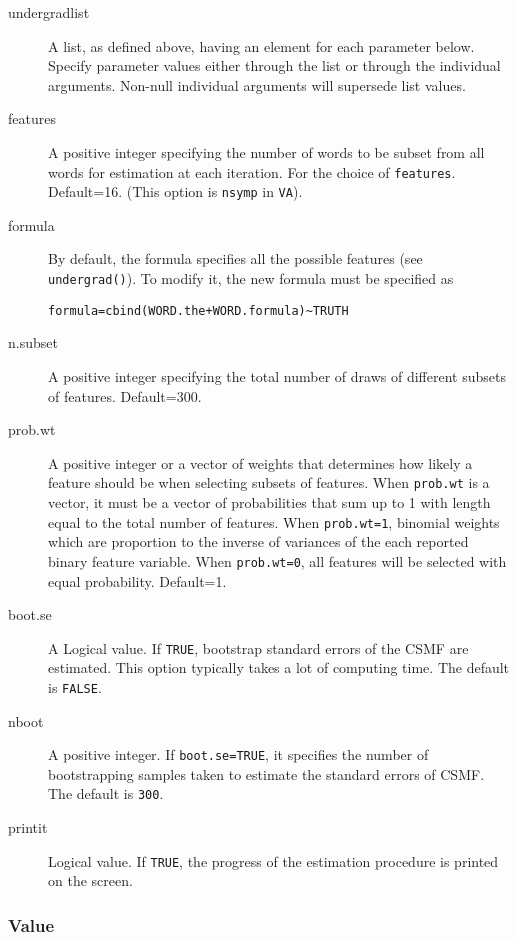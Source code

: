 \documentclass[oneside,letterpaper,titlepage]{article}
\begin{document}
\begin{description}
 
\item[undergradlist] A list, as defined above, having an element for
  each parameter below. Specify parameter values either through the
  list or through the individual arguments. Non-null individual
  arguments will supersede list values.
\item[features] A positive integer specifying the number of words to
  be subset from all words for estimation at each iteration. For the
  choice of \texttt{features}.  Default=16.  (This option is
  \texttt{nsymp} in \texttt{VA}).
  \item[formula] By default, the formula specifies all the
possible features (see \texttt{undergrad()}).  To modify it, the new formula
must be specified as
\begin{verbatim}
formula=cbind(WORD.the+WORD.formula)~TRUTH
\end{verbatim} 
\item[n.subset] A positive integer specifying the total number of
  draws of different subsets of features.  Default=300.
\item[prob.wt] A positive integer or a vector of weights that
  determines how likely a feature should be when selecting subsets of
  features.  When \texttt{prob.wt} is a vector, it must be a vector of
  probabilities that sum up to 1 with length equal to the total number
  of features.  When \texttt{prob.wt=1}, binomial weights which are
  proportion to the inverse of variances of the each reported binary
  feature variable.  When \texttt{prob.wt=0}, all features will be
  selected with equal probability.  Default=1.
\item[boot.se] A Logical value. If \texttt{TRUE}, bootstrap standard
  errors of the CSMF are estimated.  This option typically takes a lot
  of computing time. The default is \texttt{FALSE}.
\item[nboot] A positive integer. If \texttt{boot.se=TRUE}, it
  specifies the number of bootstrapping samples taken to estimate the
  standard errors of CSMF. The default is \texttt{300}.
\item[printit] Logical value. If \texttt{TRUE}, the progress of the
  estimation procedure is printed on the screen.

\end{description}


\subsubsection{Value}
\end{document}
